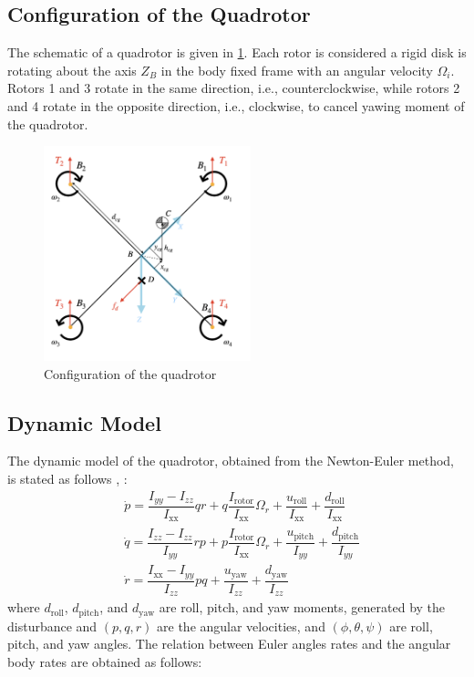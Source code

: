 \documentclass[conference]{IEEEtran}
\begin{document}
\subsection{Configuration of the Quadrotor }
The schematic of a quadrotor is given in \figurename{\ref{QuadAssum}}. Each rotor is considered a rigid disk is rotating about the axis $Z_B$ in the body fixed frame with an angular velocity $\Omega_i$.
Rotors 1 and 3 rotate in the same direction, i.e., counterclockwise, while rotors 2 and 4 rotate in the opposite direction, i.e., clockwise, to cancel yawing moment of the quadrotor.
\begin{figure}[!h]
	\includegraphics[width=6cm]{../Figures/Forces/StandAssumations.png}
	\centering
	\caption{Configuration of the quadrotor}
	\label{QuadAssum}
\end{figure}
\subsection{Dynamic Model}
The dynamic model of the quadrotor, obtained from the Newton-Euler method, is stated as follows \cite{b15}, \cite{b16}:
\begin{equation}
	\begin{split}
		&\dot p = \dfrac{I_{yy} - I_{zz}}{I_{\text{xx}}} qr + q \dfrac{I_{\text{rotor}}}{I_{\text{xx}}}\Omega_r + \dfrac{u_{\text{roll}}}{I_{\text{xx}}} + \dfrac{d_{\text{roll}}}{I_{\text{xx}}} \\
		&\dot q = \dfrac{I_{zz} - I_{zz}}{I_{yy}} rp + p \dfrac{I_{\text{rotor}}}{I_{\text{xx}}}\Omega_r + \dfrac{u_{\text{pitch}}}{I_{yy}} + \dfrac{d_{\text{pitch}}}{I_{yy}} \\
		&\dot r = \dfrac{I_{\text{xx}} - I_{yy}}{I_{zz}} pq  +  \dfrac{u_{\text{yaw}}}{I_{zz}} + \dfrac{d_{\text{yaw}}}{I_{zz}}
	\end{split}
\end{equation}
where $d_{\text{roll}}$, $d_{\text{pitch}}$, and $d_{\text{yaw}}$ are roll, pitch, and yaw moments, generated by the disturbance and  $(p, q, r)$ are the angular velocities, and $(\phi, \theta, \psi)$ are roll, pitch, and yaw angles. The relation between Euler angles rates and the angular body rates are obtained as follows:
\end{document}

